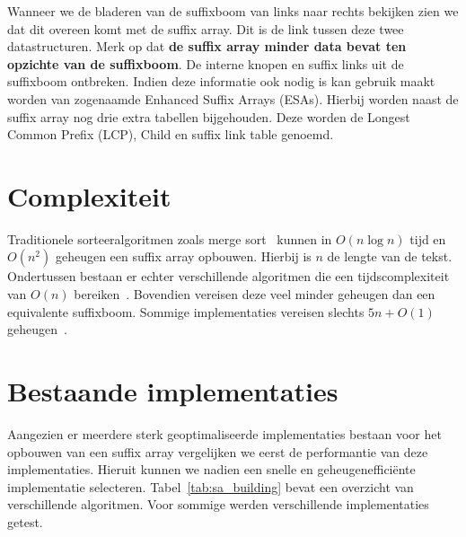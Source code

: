 Wanneer we de bladeren van de suffixboom van links naar rechts bekijken zien we dat dit overeen komt met de suffix array.
Dit is de link tussen deze twee datastructuren.
Merk op dat \textbf{de suffix array minder data bevat ten opzichte van de suffixboom}.
De interne knopen en suffix links uit de suffixboom ontbreken.
Indien deze informatie ook nodig is kan gebruik maakt worden van zogenaamde Enhanced Suffix Arrays (ESAs).
Hierbij worden naast de suffix array nog drie extra tabellen bijgehouden.
Deze worden de Longest Common Prefix (LCP), Child en suffix link table genoemd.

\section{Complexiteit}\label{sec:complexiteit}
Traditionele sorteeralgoritmen zoals merge sort~\cite{mergeSort} kunnen in $O(n \log n)$ tijd en $O(n^2)$ geheugen een suffix array opbouwen.
Hierbij is $n$ de lengte van de tekst.
Ondertussen bestaan er echter verschillende algoritmen die een tijdscomplexiteit van $O(n)$ bereiken~\cite{sais, ko_alura, radixSA, dark_archon, libdivsufsort}.
Bovendien vereisen deze veel minder geheugen dan een equivalente suffixboom.
Sommige implementaties vereisen slechts $5n + O(1)$ geheugen~\cite{dark_archon, libdivsufsort}.


\section{Bestaande implementaties}\label{sec:bestaande-implementaties}
Aangezien er meerdere sterk geoptimaliseerde implementaties bestaan voor het opbouwen van een suffix array vergelijken we eerst de performantie van deze implementaties.
Hieruit kunnen we nadien een snelle en geheugenefficiënte implementatie selecteren.
Tabel~\ref{tab:sa_building} bevat een overzicht van verschillende algoritmen.
Voor sommige werden verschillende implementaties getest.


